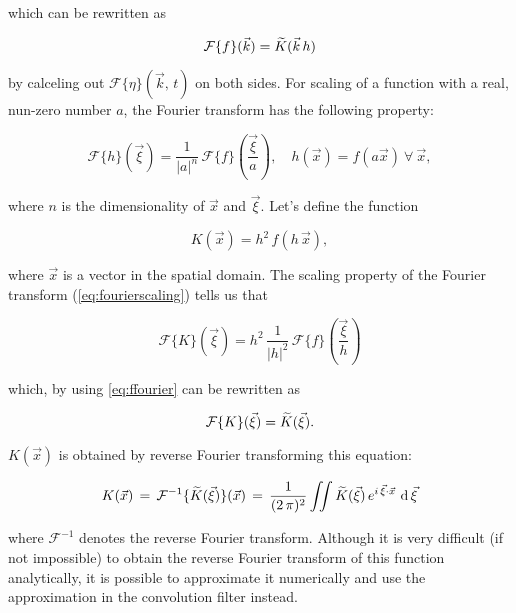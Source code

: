 which can be rewritten as

\begin{equation} \label{eq:ffourier}
\mathcal{F}\{f\}(\vec{k}) = \widetilde{K}(\vec{k}\,h)
\end{equation}

by calceling out $\mathcal{F}\{\eta\}(\vec{k},\,t)$ on both sides. For scaling of a function with a real, nun-zero number $a$, the Fourier transform has the following property:

\begin{equation} \label{eq:fourierscaling}
\mathcal{F}\{h\}(\vec{\xi}) = \frac{1}{|a|^n}\,\mathcal{F}\{f\}\left(\frac{\vec{\xi}}{a}\right)
,\quad
h(\vec{x}) = f(a\vec{x})\ \forall\ \vec{x},
\end{equation}

where $n$ is the dimensionality of $\vec{x}$ and $\vec{\xi}$. Let's define the function

\begin{equation} \label{eq:ftokernel}
K(\vec{x}) = h^2\,f(h\,\vec{x}),
\end{equation}

where $\vec{x}$ is a  vector in the spatial domain. The scaling property of the Fourier transform (\eqref{eq:fourierscaling}) tells us that

\begin{equation}
\mathcal{F}\{K\}(\vec{\xi}) = h^2\,\frac{1}{|h|^2}\,\mathcal{F}\{f\}\left(\frac{\vec{\xi}}{h}\right)
\end{equation}

which, by using \eqref{eq:ffourier} can be rewritten as

\begin{equation}
\mathcal{F}\{K\}(\vec{\xi}) = \widetilde{K}(\vec{\xi}).
\end{equation}

$K(\vec{x})$ is obtained by reverse Fourier transforming this equation:

\begin{equation} \label{eq:kernelfour2d}
K(\vec{x})\, = \,\mathcal{F}^{-1}\{\widetilde{K}(\vec{\xi})\}(\vec{x})\, = \,\frac{1}{(2\,\pi)^2}\iint\widetilde{K}(\vec{\xi})\,e^{i\,\vec{\xi}\cdot\vec{x}}\,\operatorname{d}\vec{\xi}
\end{equation}

where $\mathcal{F}^{-1}$ denotes the reverse Fourier transform. Although it is very difficult (if not impossible) to obtain the reverse Fourier transform of this function analytically, it is possible to approximate it numerically and use the approximation in the convolution filter instead.

